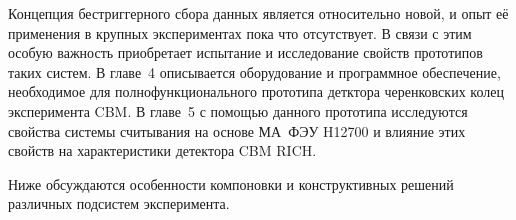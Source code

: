 Концепция бестриггерного сбора данных является относительно новой, и опыт её применения в крупных экспериментах пока что отсутствует. В связи с этим особую важность приобретает испытание и исследование свойств прототипов таких систем. В главе~4 описывается оборудование и программное обеспечение, необходимое для полнофункционального прототипа детктора черенковских колец эксперимента CBM. В главе~5 с помощью данного прототипа исследуются свойства системы считывания на основе МА~ФЭУ H12700 и влияние этих свойств на характеристики детектора CBM RICH.



Ниже обсуждаются особенности компоновки и конструктивных решений различных подсистем эксперимента.

\bigskip
